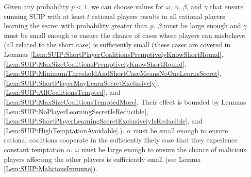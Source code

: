 \documentclass{dalcsthesis}
\begin{document}
Given any probability $p < 1$, we can choose values for $\omega$, $\alpha$, $\beta$, and $\gamma$ that ensure running SUIP with at least $t$ rational players results in all rational players learning the secret with probability greater than $p$. $\beta$ must be large enough and $\gamma$ must be small enough to ensure the chance of cases where players can misbehave (all related to the short case) is sufficiently small (these cases are covered in Lemmas \ref{Lem:SUIP:ShortPlayerCoalitionsPremptivelyKnowShortRound}, \ref{Lem:SUIP:MaxSizeCoalitionsPremptivelyKnowShortRound}, \ref{Lem:SUIP:MinimumThresholdAndShortCaseMeansNoOneLearnsSecret}, \ref{Lem:SUIP:ShortPlayerMayLearnSecretExclusively}, \ref{Lem:SUIP:AllCoalitionsTempted}, and \ref{Lem:SUIP:MaxSizeCoalitionsTemptedMore}. Their effect is bounded by Lemmas \ref{Lem:SUIP:NoPlayerLearningSecretIsReducible}, \ref{Lem:SUIP:ShortPlayerLearningSecretExclusivelyIsReducible}, and \ref{Lem:SUIP:HighTemptationAvoidable}.). $\alpha$ must be small enough to ensure rational coalitions cooperate in the sufficiently likely case that they experience constant temptation $\alpha$. $\omega$ must be large enough to ensure the chance of malicious players affecting the other players is sufficiently small (see Lemma \ref{Lem:SUIP:MaliciousImmune}).
\end{document}
